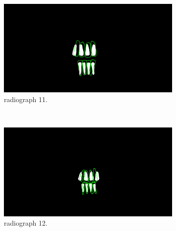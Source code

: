 \documentclass[a4paper,10pt]{article}
\begin{document}
\begin{figure}
\centering
	\caption{The comparison between our found incisors (white) and the real incisors (green) for:}\label{fig:animals2}
        ~ %
        \begin{subfigure}[b]{0.45\textwidth}
                \includegraphics[width=\textwidth]{Images/segLand,11.jpg}
                \caption{ radiograph 11.}
                \label{fig:comp3}
        \end{subfigure}
        ~ %
        \begin{subfigure}[b]{0.45\textwidth}
                \includegraphics[width=\textwidth]{Images/segLand,12.jpg}
                \caption{ radiograph 12.}
                \label{fig:comp3}
        \end{subfigure}
        ~ %
        \begin{subfigure}[b]{0.45\textwidth}

\end{subfigure}
\end{figure}
\end{document}
